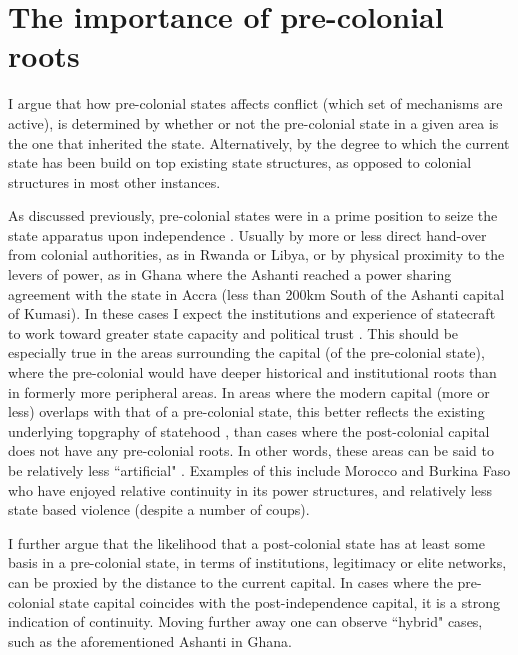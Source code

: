 \documentclass[12pt]{article}
\begin{document}
\section{The importance of pre-colonial roots}

I argue that how pre-colonial states affects conflict (which set of mechanisms
are active), is determined by whether or not the pre-colonial state in a given
area is the one that inherited the state. Alternatively, by the degree to which
the current state has been build on top existing state structures, as opposed to
colonial structures in most other instances. 

As discussed previously, pre-colonial states were in a prime position to seize
the state apparatus upon independence \citep{Paine2019}. Usually by more or less
direct hand-over from colonial authorities, as in Rwanda or Libya, or by
physical proximity to the levers of power, as in Ghana where the Ashanti reached
a power sharing agreement with the state in Accra (less than 200km South of the
Ashanti capital of Kumasi). In these cases I expect the institutions and
experience of statecraft to work toward greater state capacity and political
trust \citep{Depetris-Chauvin2016}. This should be especially true in the areas
surrounding the capital (of the pre-colonial state), where the pre-colonial
would have deeper historical and institutional roots than in formerly more
peripheral areas. In areas where the modern capital (more or less) overlaps with
that of a pre-colonial state, this better reflects the existing underlying
topgraphy of statehood , than cases where the post-colonial capital does not
have any pre-colonial roots. In other words, these areas can be said to be
relatively less ``artificial" \citep{Alesina2011}. Examples of this include
Morocco and Burkina Faso who have enjoyed relative continuity in its power
structures, and relatively less state based violence (despite a number of
coups). 

I further argue that the likelihood that a post-colonial state has at least some
basis in a pre-colonial state, in terms of institutions, legitimacy or elite
networks, can be proxied by the distance to the current capital. In cases where
the pre-colonial state capital coincides with the post-independence capital, it
is a strong indication of continuity. Moving further away one can observe
``hybrid" cases, such as the aforementioned Ashanti in Ghana. 

\end{document}
